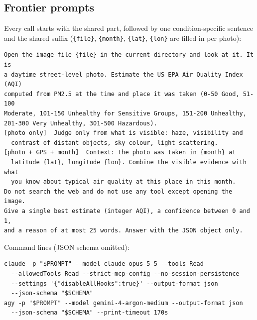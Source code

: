 \documentclass[conference]{IEEEtran}
\begin{document}
\subsection{Frontier prompts}
Every call starts with the shared part, followed by one condition-specific
sentence and the shared suffix (\texttt{\{file\}}, \texttt{\{month\}},
\texttt{\{lat\}}, \texttt{\{lon\}} are filled in per photo):
\begin{lstlisting}
Open the image file {file} in the current directory and look at it. It is
a daytime street-level photo. Estimate the US EPA Air Quality Index (AQI)
computed from PM2.5 at the time and place it was taken (0-50 Good, 51-100
Moderate, 101-150 Unhealthy for Sensitive Groups, 151-200 Unhealthy,
201-300 Very Unhealthy, 301-500 Hazardous).
[photo only]  Judge only from what is visible: haze, visibility and
  contrast of distant objects, sky colour, light scattering.
[photo + GPS + month]  Context: the photo was taken in {month} at
  latitude {lat}, longitude {lon}. Combine the visible evidence with what
  you know about typical air quality at this place in this month.
Do not search the web and do not use any tool except opening the image.
Give a single best estimate (integer AQI), a confidence between 0 and 1,
and a reason of at most 25 words. Answer with the JSON object only.
\end{lstlisting}
Command lines (JSON schema omitted):
\begin{lstlisting}
claude -p "$PROMPT" --model claude-opus-5-5 --tools Read
  --allowedTools Read --strict-mcp-config --no-session-persistence
  --settings '{"disableAllHooks":true}' --output-format json
  --json-schema "$SCHEMA"
agy -p "$PROMPT" --model gemini-4-argon-medium --output-format json
  --json-schema "$SCHEMA" --print-timeout 170s
\end{lstlisting}
\end{document}
